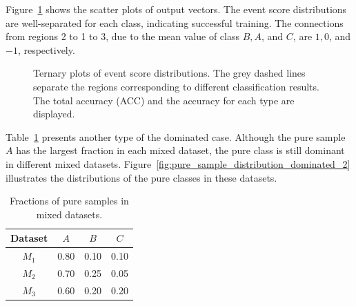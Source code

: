 \documentclass[12pt]{article}
\begin{document}
        Figure~\ref{fig:event_score_distribution_dominated_1} shows the scatter plots of output vectors. The event score distributions are well-separated for each class, indicating successful training. The connections from regions 2 to 1 to 3, due to the mean value of class $B, A$, and $C$, are $1, 0$, and $-1$, respectively.  
        \begin{figure}[htpb]
            \centering
            \caption{Ternary plots of event score distributions. The grey dashed lines separate the regions corresponding to different classification results. The total accuracy (ACC) and the accuracy for each type are displayed.}
            \label{fig:event_score_distribution_dominated_1}
        \end{figure}  

        Table~\ref{tab:type_fraction_dominated_2} presents another type of the dominated case. Although the pure sample $A$ has the largest fraction in each mixed dataset, the pure class is still dominant in different mixed datasets. Figure~\ref{fig:pure_sample_distribution_dominated_2} illustrates the distributions of the pure classes in these datasets.  
        \begin{table}[htpb]
            \centering
            \caption{Fractions of pure samples in mixed datasets.}
            \label{tab:type_fraction_dominated_2}
            \begin{tabular}{c|ccc}
                Dataset & $A$  & $B$  & $C$  \\ \hline
                $M_1$   & 0.80 & 0.10 & 0.10 \\
                $M_2$   & 0.70 & 0.25 & 0.05 \\
                $M_3$   & 0.60 & 0.20 & 0.20
            \end{tabular}
        \end{table}  
\end{document}
